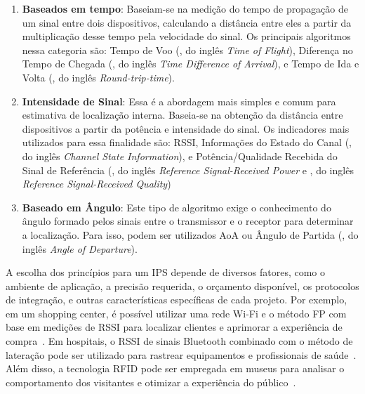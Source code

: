 \begin{enumerate}
    \item \textbf{Baseados em tempo}: Baseiam-se na medição do tempo de propagação de um sinal entre dois dispositivos, calculando a distância entre eles a partir da multiplicação desse tempo pela velocidade do sinal. Os principais algoritmos nessa categoria são:  Tempo de Voo (, do inglês \textit{Time of Flight}), Diferença no Tempo de Chegada (, do inglês \textit{Time Difference of Arrival}), e Tempo de Ida e Volta (, do inglês \textit{Round-trip-time}).

    \item \textbf{Intensidade de Sinal}: Essa é a abordagem mais simples e comum para estimativa de localização interna. Baseia-se na obtenção da distância entre dispositivos a partir da potência e intensidade do sinal. Os indicadores mais utilizados para essa finalidade são: RSSI, Informações do Estado do Canal (, do inglês \textit{Channel State Information}), e Potência/Qualidade Recebida do Sinal de Referência (, do inglês \textit{Reference Signal-Received Power} e , do inglês \textit{Reference Signal-Received Quality})

    \item \textbf{Baseado em Ângulo}: Este tipo de algoritmo exige o conhecimento do ângulo formado pelos sinais entre o transmissor e o receptor para determinar a localização. Para isso, podem ser utilizados AoA ou Ângulo de Partida (, do inglês \textit{Angle of Departure}).
\end{enumerate}

A escolha dos princípios para um IPS depende de diversos fatores, como o ambiente de aplicação, a precisão requerida, o orçamento disponível, os protocolos de integração, e outras características específicas de cada projeto. Por exemplo, em um shopping center, é possível utilizar uma rede Wi-Fi e o método FP com base em medições de RSSI para localizar clientes e aprimorar a experiência de compra~\cite{Lopez2019}. Em hospitais, o RSSI de sinais Bluetooth combinado com o método de lateração pode ser utilizado para rastrear equipamentos e profissionais de saúde~\cite{Casareo2018}. Além disso, a tecnologia RFID pode ser empregada em museus para analisar o comportamento dos visitantes e otimizar a experiência do público~\cite{Vena2021}.
 
